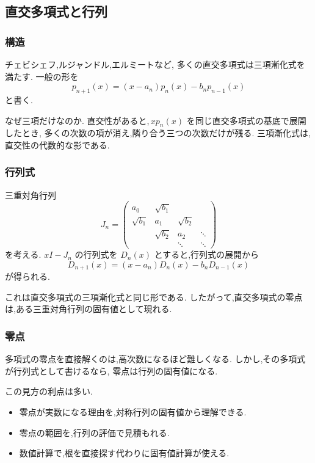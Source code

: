 \subsection{直交多項式と行列}

\subsubsection{構造}

チェビシェフ,ルジャンドル,エルミートなど,
多くの直交多項式は三項漸化式を満たす.
一般の形を
\[
  p_{n+1}(x)
  =(x-a_n)p_n(x)-b_np_{n-1}(x)
\]
と書く.

なぜ三項だけなのか.
直交性があると,\,$xp_n(x)$ を同じ直交多項式の基底で展開したとき,
多くの次数の項が消え,隣り合う三つの次数だけが残る.
三項漸化式は,直交性の代数的な影である.

\subsubsection{行列式}

三重対角行列
\[
  J_n=
  \begin{pmatrix}
    a_0&\sqrt{b_1}&&\\
    \sqrt{b_1}&a_1&\sqrt{b_2}&\\
    &\sqrt{b_2}&a_2&\ddots\\
    &&\ddots&\ddots
  \end{pmatrix}
\]
を考える.
$xI-J_n$ の行列式を $D_n(x)$ とすると,行列式の展開から
\[
  D_{n+1}(x)
  =(x-a_n)D_n(x)-b_nD_{n-1}(x)
\]
が得られる.

これは直交多項式の三項漸化式と同じ形である.
したがって,直交多項式の零点は,ある三重対角行列の固有値として現れる.

\subsubsection{零点}

多項式の零点を直接解くのは,高次数になるほど難しくなる.
しかし,その多項式が行列式として書けるなら,
零点は行列の固有値になる.

この見方の利点は多い.

\begin{itemize}
  \item 零点が実数になる理由を,対称行列の固有値から理解できる.
  \item 零点の範囲を,行列の評価で見積もれる.
  \item 数値計算で,根を直接探す代わりに固有値計算が使える.
\end{itemize}


